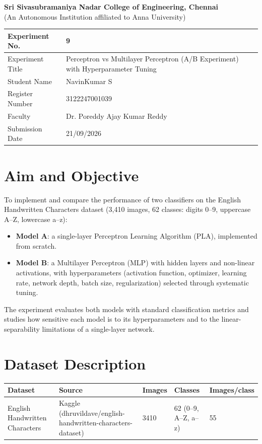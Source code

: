 \documentclass[12pt,a4paper]{article}
\begin{document}
\begin{center}
{\large \textbf{Sri Sivasubramaniya Nadar College of Engineering, Chennai}}\\
{\small (An Autonomous Institution affiliated to Anna University)}
\end{center}
\vspace{0.3cm}

\begin{tabular}{|p{4cm}|p{11cm}|}
\hline
Experiment No. & 9 \\ \hline
Experiment Title & Perceptron vs Multilayer Perceptron (A/B Experiment) with Hyperparameter Tuning \\ \hline
Student Name & NavinKumar S \\ \hline
Register Number & 3122247001039 \\ \hline
Faculty & Dr. Poreddy Ajay Kumar Reddy \\ \hline
Submission Date & 21/09/2026 \\ \hline
\end{tabular}

\section{Aim and Objective}
To implement and compare the performance of two classifiers on the English Handwritten Characters
dataset (3{,}410 images, 62 classes: digits 0--9, uppercase A--Z, lowercase a--z):
\begin{itemize}
\item \textbf{Model A}: a single-layer Perceptron Learning Algorithm (PLA), implemented from scratch.
\item \textbf{Model B}: a Multilayer Perceptron (MLP) with hidden layers and non-linear activations,
with hyperparameters (activation function, optimizer, learning rate, network depth, batch size,
regularization) selected through systematic tuning.
\end{itemize}
The experiment evaluates both models with standard classification metrics and studies how sensitive
each model is to its hyperparameters and to the linear-separability limitations of a single-layer
network.

\section{Dataset Description}
\begin{longtable}{|p{4cm}|p{5cm}|p{1.6cm}|p{1.8cm}|p{2.2cm}|}
\hline
\textbf{Dataset} & \textbf{Source} & \textbf{Images} & \textbf{Classes} & \textbf{Images/class} \\ \hline
English Handwritten Characters & Kaggle (dhruvildave/english-handwritten-characters-dataset) & 3410 & 62 (0--9, A--Z, a--z) & 55 \\ \hline
\end{longtable}
\end{document}
